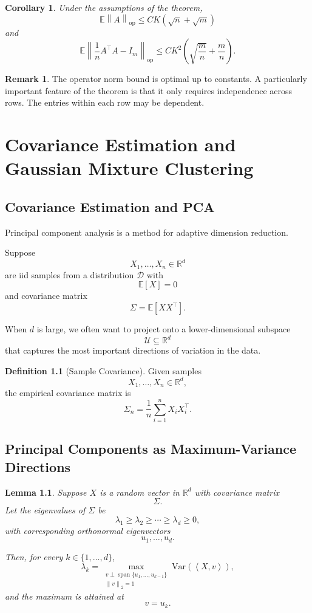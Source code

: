 \documentclass[12pt,oneside]{book}
\numberwithin{equation}{section}
\theoremstyle{definition}
\newtheorem{definition}{Definition}[section]
\newtheorem{remark}{Remark}[section]
\theoremstyle{plain}
\newtheorem{lemma}{Lemma}[section]
\newtheorem{corollary}{Corollary}[section]
\theoremstyle{remark}
\newcommand{\R}{\mathbb{R}}
\newcommand{\E}{\mathbb{E}}
\newcommand{\Var}{\mathrm{Var}}
\newcommand{\norm}[1]{\left\lVert #1 \right\rVert}
\newcommand{\inner}[2]{\left\langle #1, #2 \right\rangle}
\begin{document}
\begin{corollary}
Under the assumptions of the theorem,
\[
\E\norm{A}_{\mathrm{op}}
\leq
CK(\sqrt{n}+\sqrt{m})
\]
and
\[
\E\norm{\frac{1}{n}A^\top A-I_m}_{\mathrm{op}}
\leq
CK^2\left(
\sqrt{\frac{m}{n}}+\frac{m}{n}
\right).
\]
\end{corollary}

\begin{remark}
The operator norm bound is optimal up to constants. A particularly important feature of the theorem is that it only requires independence across rows. The entries within each row may be dependent.
\end{remark}

\chapter{Covariance Estimation and Gaussian Mixture Clustering}

\section{Covariance Estimation and PCA}

Principal component analysis is a method for adaptive dimension reduction.

Suppose
\[
X_1,\dots,X_n\in\R^d
\]
are iid samples from a distribution $\mathcal{D}$ with
\[
\E[X]=0
\]
and covariance matrix
\[
\Sigma=\E[XX^\top].
\]

When $d$ is large, we often want to project onto a lower-dimensional subspace
\[
\mathcal{U}\subseteq\R^d
\]
that captures the most important directions of variation in the data.

\begin{definition}[Sample Covariance]
Given samples
\[
X_1,\dots,X_n\in\R^d,
\]
the empirical covariance matrix is
\[
\Sigma_n
=
\frac{1}{n}
\sum_{i=1}^n X_iX_i^\top.
\]
\end{definition}

\section{Principal Components as Maximum-Variance Directions}

\begin{lemma}
Suppose $X$ is a random vector in $\R^d$ with covariance matrix
\[
\Sigma.
\]
Let the eigenvalues of $\Sigma$ be
\[
\lambda_1\geq \lambda_2\geq \cdots \geq \lambda_d\geq 0,
\]
with corresponding orthonormal eigenvectors
\[
u_1,\dots,u_d.
\]

Then, for every $k\in\{1,\dots,d\}$,
\[
\lambda_k
=
\max_{\substack{
v\perp \operatorname{span}\{u_1,\dots,u_{k-1}\}\\
\norm{v}_2=1
}}
\Var(\inner{X}{v}),
\]
and the maximum is attained at
\[
v=u_k.
\]
\end{lemma}
\end{document}
